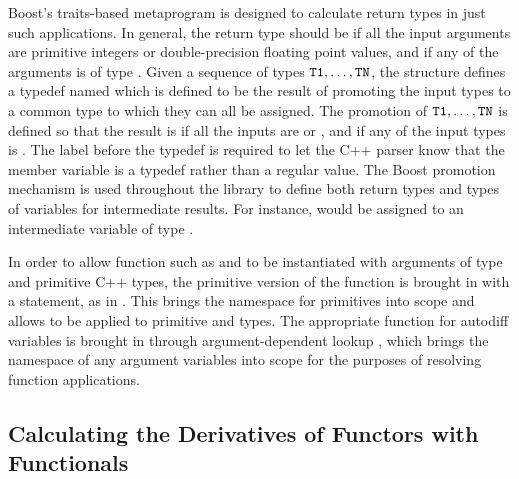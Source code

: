 \documentclass[10pt]{article}
\begin{document}
Boost's traits-based metaprogram 
\citep{Boost:2011} is designed to calculate return types in just such
applications.  In general, the return type should be  if
all the input arguments are primitive integers or double-precision
floating point values, and  if any of the arguments
is of type .  Given a sequence of types ${\tt T1},
\ldots, {\tt TN}$, the structure
 defines a typedef
named  which is defined to be the result of promoting the
input types to a common type to which they can all be assigned.  The
promotion of ${\tt T1}, \ldots, {\tt TN}$ is defined so that the
result is  if all the inputs are  or
, and  if any of the input types is
.  The label  before the typedef is
required to let the C++ parser know that the member variable is a
typedef rather than a regular value.  The Boost promotion mechanism is
used throughout the  library to define both return
types and types of variables for intermediate results.  For instance,
 would be assigned to an intermediate variable of type
.

In order to allow function such as  and  to be
instantiated with arguments of type  and primitive
C++ types, the primitive version of the function is brought in with a
 statement, as in .  This brings the
namespace for primitives into scope and allows  to be
applied to primitive  and  types.  The
appropriate function for autodiff variables  is
brought in through argument-dependent lookup
\cite[Section~3.4]{cpp-standard:2003}, which brings the namespace of
any argument variables into scope for the purposes of resolving
function applications.


\subsection{Calculating the Derivatives of Functors with Functionals}
\end{document}
